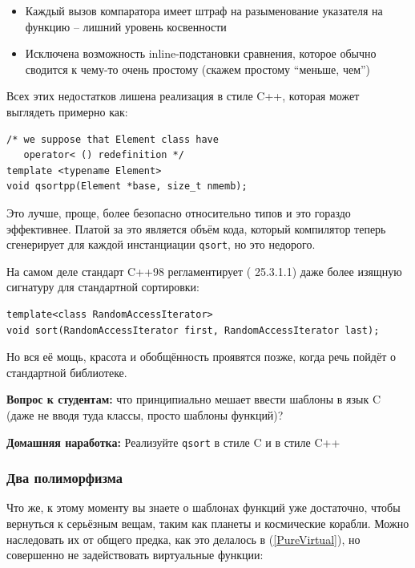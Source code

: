 \documentclass[a4paper,12pt,oneside]{article}
\newif\ifanswers
\begin{document}
\begin{itemize}
\item Каждый вызов компаратора имеет штраф на разыменование указателя на функцию -- лишний уровень косвенности
\item Исключена возможность inline-подстановки сравнения, которое обычно сводится к чему-то очень простому (скажем простому ``меньше, чем'')
\end{itemize}

Всех этих недостатков лишена реализация в стиле C++, которая может выглядеть примерно как:

\begin{lstlisting}
/* we suppose that Element class have 
   operator< () redefinition */
template <typename Element>
void qsortpp(Element *base, size_t nmemb);
\end{lstlisting}

Это лучше, проще, более безопасно относительно типов и это гораздо эффективнее. Платой за это является объём кода, который компилятор теперь сгенерирует для каждой инстанциации \lstinline!qsort!, но это недорого.

На самом деле стандарт C++98 регламентирует (\cite{stdcpp98} 25.3.1.1) даже более изящную сигнатуру для стандартной сортировки:

\begin{lstlisting}
template<class RandomAccessIterator>
void sort(RandomAccessIterator first, RandomAccessIterator last);
\end{lstlisting}

Но вся её мощь, красота и обобщённость проявятся позже, когда речь пойдёт о стандартной библиотеке.

\textbf{Вопрос к студентам:} что принципиально мешает ввести шаблоны в язык C (даже не вводя туда классы, просто шаблоны функций)?

\ifanswers
В этом случае не обойтись без манглирования имён, чего в случае C никто не хочет
\fi

\textbf{Домашняя наработка:} Реализуйте \lstinline!qsort! в стиле C и в стиле C++

\subsubsection{Два полиморфизма}\label{TemplatePolymorphism}

Что же, к этому моменту вы знаете о шаблонах функций уже достаточно, чтобы вернуться к серьёзным вещам, таким как планеты и космические корабли. Можно наследовать их от общего предка, как это делалось в (\ref{PureVirtual}), но совершенно не задействовать виртуальные функции:
\end{document}
